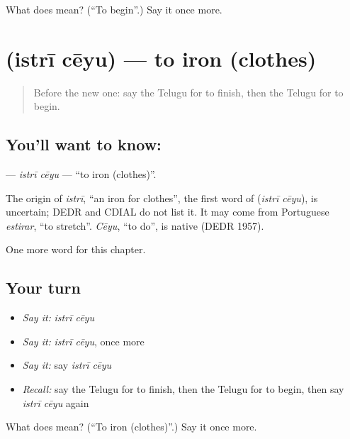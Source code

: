 \begin{tcolorbox}[breakable,colback=teal!4,colframe=teal!35!black,title={Before you move on}]
What does  mean? (\textquotedblleft{}To begin\textquotedblright{}.) Say it once more.
\end{tcolorbox}
\section[\texorpdfstring{\te{ఇస్త్రీ} \te{చేయు} (istrī cēyu)}{ఇస్త్రీ చేయు (istrī cēyu)}]{  (istrī cēyu) — to iron (clothes)}

\label{lesson:TE-C242-istri-ceyu}



\begin{quote}
Before the new one: say the Telugu for to finish, then the Telugu for to begin.
\end{quote}

\subsection*{You'll want to know:  }
\textbf{ } — \emph{istrī cēyu} — \textquotedblleft{}to iron (clothes)\textquotedblright{}.

\begin{cousinweb}
The origin of \emph{istrī}, \textquotedblleft{}an iron for clothes\textquotedblright{}, the first word of \textbf{ } (\emph{istrī cēyu}), is uncertain; DEDR and CDIAL do not list it. It may come from Portuguese \emph{estirar}, \textquotedblleft{}to stretch\textquotedblright{}. \emph{Cēyu}, \textquotedblleft{}to do\textquotedblright{}, is native (DEDR 1957).
\end{cousinweb}

\begin{grammarlens}[title={What you've built}]
One more word for this chapter.
\end{grammarlens}

\subsection*{Your turn}
\begin{itemize}
\raggedright
  \item \emph{Say it:} \emph{istrī cēyu}
  \item \emph{Say it:} \emph{istrī cēyu}, once more
  \item \emph{Say it:} say \emph{istrī cēyu}
  \item \emph{Recall:} say the Telugu for to finish, then the Telugu for to begin, then say \emph{istrī cēyu} again
\end{itemize}

\begin{tcolorbox}[breakable,colback=teal!4,colframe=teal!35!black,title={Before you move on}]
What does   mean? (\textquotedblleft{}To iron (clothes)\textquotedblright{}.) Say it once more.
\end{tcolorbox}
